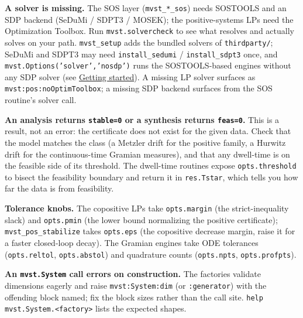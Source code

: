 \documentclass[11pt,oneside]{report}
\newcommand{\code}[1]{\texttt{#1}}
\begin{document}
\textbf{A solver is missing.} The SOS layer (\code{mvst\_*\_sos}) needs SOSTOOLS and an SDP
backend (SeDuMi / SDPT3 / MOSEK); the positive-systems LPs need the Optimization
Toolbox. Run \code{mvst.solvercheck} to see what resolves and actually solves on your
path. \code{mvst\_setup} adds the bundled solvers of \code{thirdparty/}; SeDuMi and SDPT3 may
need \code{install\_sedumi} / \code{install\_sdpt3} once, and \code{mvst.Options('solver','nosdp')}
runs the SOSTOOLS-based engines without any SDP solver (see
\protect\hyperlink{chap:01-getting-started}{Getting started}). A missing LP
solver surfaces as \code{mvst:pos:noOptimToolbox}; a missing SDP backend surfaces from
the SOS routine's solver call.

\textbf{An analysis returns \code{stable=0} or a synthesis returns \code{feas=0}.} This is a
result, not an error: the certificate does not exist for the given data. Check
that the model matches the class (a Metzler drift for the positive family, a
Hurwitz drift for the continuous-time Gramian measures), and that any dwell-time
is on the feasible side of its threshold. The dwell-time routines expose
\code{opts.threshold} to bisect the feasibility boundary and return it in
\code{res.Tstar}, which tells you how far the data is from feasibility.

\textbf{Tolerance knobs.} The copositive LPs take \code{opts.margin} (the strict-inequality
slack) and \code{opts.pmin} (the lower bound normalizing the positive certificate);
\code{mvst\_pos\_stabilize} takes \code{opts.eps} (the copositive decrease margin, raise it
for a faster closed-loop decay). The Gramian engines take ODE
tolerances (\code{opts.reltol}, \code{opts.abstol}) and quadrature counts (\code{opts.npts},
\code{opts.profpts}).

\textbf{An \code{mvst.System} call errors on construction.} The factories validate
dimensions eagerly and raise \code{mvst:System:dim} (or \code{:generator}) with the
offending block named; fix the block sizes rather than the call site. \code{help mvst.System.\textless{}factory\textgreater{}} lists the expected shapes.
\end{document}
